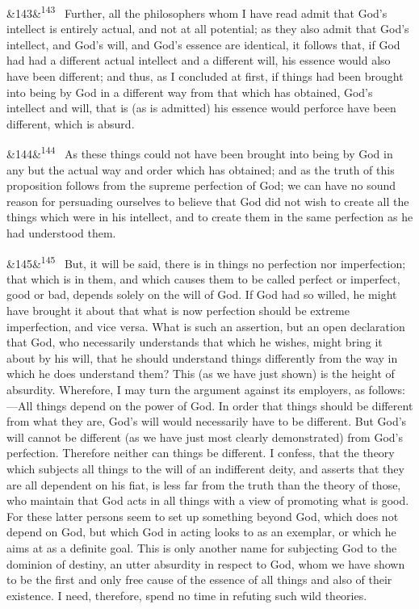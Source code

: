 \documentclass[12pt]{article}
\newcommand{\para}[1][]{\par\noindent\ifx&#1&\else\textsuperscript{\footnotesize #1}~\fi}
\begin{document}
\para[143] Further, all the philosophers whom I have read admit that God's intellect is entirely actual, and not at all potential; as they also admit that God's intellect, and God's will, and God's essence are identical, it follows that, if God had had a different actual intellect and a different will, his essence would also have been different; and thus, as I concluded at first, if things had been brought into being by God in a different way from that which has obtained, God's intellect and will, that is (as is admitted) his essence would perforce have been different, which is absurd.

\para[144] As these things could not have been brought into being by God in any but the actual way and order which has obtained; and as the truth of this proposition follows from the supreme perfection of God; we can have no sound reason for persuading ourselves to believe that God did not wish to create all the things which were in his intellect, and to create them in the same perfection as he had understood them.

\para[145] But, it will be said, there is in things no perfection nor imperfection; that which is in them, and which causes them to be called perfect or imperfect, good or bad, depends solely on the will of God. If God had so willed, he might have brought it about that what is now perfection should be extreme imperfection, and vice versa. What is such an assertion, but an open declaration that God, who necessarily understands that which he wishes, might bring it about by his will, that he should understand things differently from the way in which he does understand them? This (as we have just shown) is the height of absurdity. Wherefore, I may turn the argument against its employers, as follows:---All things depend on the power of God. In order that things should be different from what they are, God's will would necessarily have to be different. But God's will cannot be different (as we have just most clearly demonstrated) from God's perfection. Therefore neither can things be different. I confess, that the theory which subjects all things to the will of an indifferent deity, and asserts that they are all dependent on his fiat, is less far from the truth than the theory of those, who maintain that God acts in all things with a view of promoting what is good. For these latter persons seem to set up something beyond God, which does not depend on God, but which God in acting looks to as an exemplar, or which he aims at as a definite goal. This is only another name for subjecting God to the dominion of destiny, an utter absurdity in respect to God, whom we have shown to be the first and only free cause of the essence of all things and also of their existence. I need, therefore, spend no time in refuting such wild theories.
\end{document}
